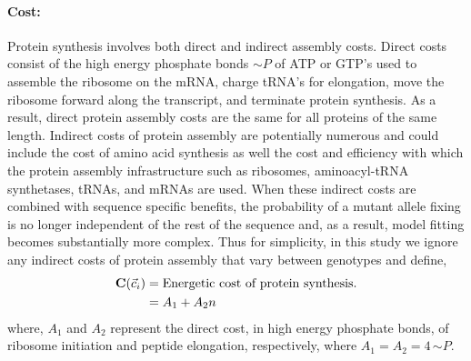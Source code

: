 \documentclass{article}
\newcommand{\Costcveci}{\ensuremath{\Cost(\cveci)}\xspace}
\newcommand{\Cost}{\ensuremath{\text{\textbf{C}}}\xspace}
\newcommand{\simP}{\ensuremath{\sim P}\xspace}
\newcommand{\cveci}{\ensuremath{\cvec_i}\xspace}
\newcommand{\cvec}{\ensuremath{\Vec{c}}\xspace}
\begin{document}
\paragraph*{Cost:}
Protein synthesis involves both direct and indirect assembly costs.
Direct costs consist of the high energy phosphate bonds \simP of ATP or GTP's used to assemble the ribosome on the mRNA, charge tRNA's for elongation, move the ribosome forward along the transcript, and terminate protein synthesis.
As a result, direct protein assembly costs are the same for all proteins of the same length.
Indirect costs of protein assembly are potentially numerous and could include the cost of amino acid synthesis as well the cost and efficiency with which the protein assembly infrastructure such as ribosomes, aminoacyl-tRNA synthetases, tRNAs, and mRNAs are used.
When these indirect costs are combined with sequence specific benefits, the probability of a mutant allele fixing is no longer independent of the rest of the sequence \citep{GilchristEtAl2015} and, as a result, model fitting becomes substantially more complex.
Thus for simplicity, in this study we ignore any indirect costs of protein assembly that vary between genotypes and define,
\begin{align}
\label{eq:defineCost}
  \Costcveci  &= \text{Energetic cost of protein synthesis.}\\
  &= A_1 + A_2 n
\end{align}
where, $A_1$ and $A_2$ represent the direct cost, in high energy phosphate bonds, of ribosome initiation and peptide elongation, respectively, where $A_1 = A_2 = 4  \, \simP$.
\end{document}
